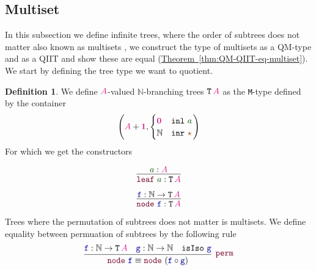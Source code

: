 \documentclass[twoside,11pt,openright]{report}
\theoremstyle{plain} %
\theoremstyle{definition}
\newtheorem{defn}[thm]{Definition}%
\theoremstyle{remark}
\newcommand*{\thmref}[1]{\hyperref[thm:#1]{Theorem~\ref*{thm:#1}}} %
\newcommand*{\term}[1]{\textcolor{green!30!black}{#1}} %
\newcommand*{\type}[1]{\textcolor{magenta!90!black}{#1}}
\newcommand*{\unit}{\type{\textbf{1}}}
\newcommand*{\empt}{\type{\textbf{0}}}
\newcommand*{\constant}[1]{\textcolor{orange!60!black}{\ensuremath{\mathtt{#1}}}}
\newcommand*{\function}[1]{\textcolor{blue!60!black}{\ensuremath{\mathtt{#1}}}}
\newcommand*{\constructor}[1]{\textcolor{purple!60!black}{\ensuremath{\mathtt{#1}}}}
\newcommand*{\typeformer}[1]{\ensuremath{\mathtt{#1}}}
\newcommand*{\unitelem}{\constant{\star}} %
\begin{document}
\subsection{Multiset}
In this subsection we define infinite trees, where the order of subtrees does not matter also known as multisets \cite{DBLP:QIIT}\cite{DBLP:tt-in-tt}\cite{DBLP:Constructing-QIITs}, we construct the type of multisets as a QM-type and as a QIIT and show these are equal (\thmref{QM-QIIT-eq-multiset}). We start by defining the tree type we want to quotient.
\begin{defn}
  We define \(\type{A}\)-valued \(\mathbb{N}\)-branching trees \(\typeformer{T}\,\type{A}\) as the \texttt{M}-type defined by the container
  \begin{equation}
    \left(\type{A}+\unit, \begin{cases} \empt & \mathtt{inl}~\term{a} \\ \mathbb{N} & \mathtt{inr}~\unitelem \end{cases}\right)
  \end{equation}
  For which we get the constructors\\[-10mm]
  \begin{center}
    \strut
    \hfill
    \begin{minipage}[b]{0.25\linewidth}
      \begin{equation}
        \vcenter{\infer{\constructor{leaf}~\term{a} : \typeformer{T}\,\type{A}}{\term{a} : \type{A}}}
      \end{equation}
    \end{minipage}
    \hfill
    \begin{minipage}[b]{0.25\linewidth}
      \begin{equation}
        \vcenter{\infer{\constructor{node}~\function{f} : \typeformer{T}\,\type{A}}{\function{f} : \mathbb{N} \rightarrow \typeformer{T}\,\type{A}}}
      \end{equation}
    \end{minipage}
    \hfill
    \strut
  \end{center}
\end{defn}
\noindent Trees where the permutation of subtrees does not matter is multisets. We define equality between permuation of subtrees by the following rule
\begin{equation}
  \vcenter{\infer[\constructor{perm}]{\constructor{node}~\function{f} \equiv \constructor{node}~(\function{f} \circ \function{g})}{\function{f} : \mathbb{N} \rightarrow \typeformer{T}\,\type{A} & \function{g} : \mathbb{N} \rightarrow \mathbb{N} & \mathtt{isIso}~\function{g}}}
\end{equation}
\end{document}
